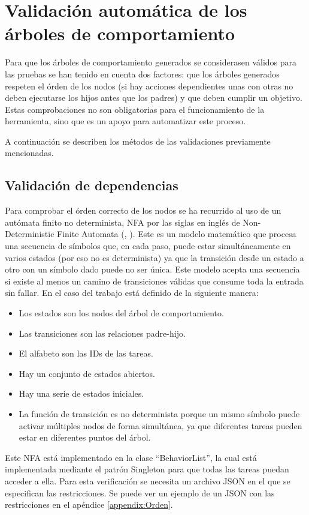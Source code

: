 \section{Validación automática de los árboles de comportamiento}
\label{sec:Validacion}

Para que los árboles de comportamiento generados se considerasen válidos para las pruebas se han tenido en cuenta dos factores: que los árboles generados respeten el órden de los nodos (si hay acciones dependientes unas con otras no deben ejecutarse los hijos antes que los padres) y que deben cumplir un objetivo.
Estas comprobaciones no son obligatorias para el funcionamiento de la herramienta, sino que es un apoyo para automatizar este proceso.

A continuación se describen los métodos de las validaciones previamente mencionadas.

\subsection{Validación de dependencias}
Para comprobar el órden correcto de los nodos se ha recurrido al uso de un autómata finito no determinista, NFA por las siglas en inglés de Non-Deterministic Finite Automata (\cite{NFA}, \cite{NFAPlan}).
Este es un modelo matemático que procesa una secuencia de símbolos que, en cada paso, puede estar simultáneamente en varios estados (por eso no es determinista) ya que la transición desde un estado a otro con un símbolo dado puede no ser única.
Este modelo acepta una secuencia si existe al menos un camino de transiciones válidas que consume toda la entrada sin fallar.
En el caso del trabajo está definido de la siguiente manera:
\begin{itemize}
    \item Los estados son los nodos del árbol de comportamiento.
    \item Las transiciones son las relaciones padre-hijo.
    \item El alfabeto son las IDs de las tareas.
    \item Hay un conjunto de estados abiertos.
    \item Hay una serie de estados iniciales.
    \item La función de transición es no determinista porque un mismo símbolo puede activar múltiples nodos de forma simultánea, ya que diferentes tareas pueden estar en diferentes puntos del árbol.
\end{itemize}
Este NFA está implementado en la clase ``BehaviorList'', la cual está implementada mediante el patrón Singleton para que todas las tareas puedan acceder a ella.
Para esta verificación se necesita un archivo JSON en el que se especifican las restricciones.
Se puede ver un ejemplo de un JSON con las restricciones en el apéndice \ref{appendix:Orden}.

